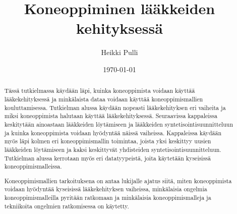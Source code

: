 \documentclass[finnish,twoside,censored,tkt,sw-line]{HYthesisML}
\title{Koneoppiminen lääkkeiden kehityksessä}
\author{Heikki Pulli}
\date{\today}
\begin{document}
\maketitle



\begin{abstract}

    Tässä tutkielmassa käydään läpi, kuinka koneoppimista voidaan käyttää lääkekehityksessä ja minkälaista dataa voidaan käyttää koneoppimismallien kouluttamisessa.
    Tutkielman alussa käydään nopeasti lääkekehityksen eri vaiheita ja miksi koneoppimista halutaan käyttää lääkekehityksessä.
    Seuraavissa kappaleissa keskitytään ainoastaan lääkkeiden löytämiseen ja lääkkeiden syntetisointisuunnitteluun ja kuinka koneoppimista voidaan hyödyntää näissä vaiheissa.
    Kappaleissa käydään myös läpi kolmen eri koneoppimismallin toimintaa, joista yksi keskittyy uusien lääkkeiden löytämiseen ja kaksi keskittyvät yhdisteiden syntetisointisuunnitteluun.
    Tutkielman alussa kerrotaan myös eri datatyypeistä, joita käytetään kyseisissä koneoppimismalleissa.

    Koneoppimismallien tarkoituksena on antaa lukijalle ajatus siitä, miten koneoppimista voidaan hyödyntää kyseisissä lääkekehityksen vaiheissa, minkälaisia ongelmia koneoppimismalleilla pyritään ratkomaan ja minkälaisia koneoppimismalleja ja tekniikoita ongelmien ratkomisessa on käytetty.


\end{abstract}


\end{document}
